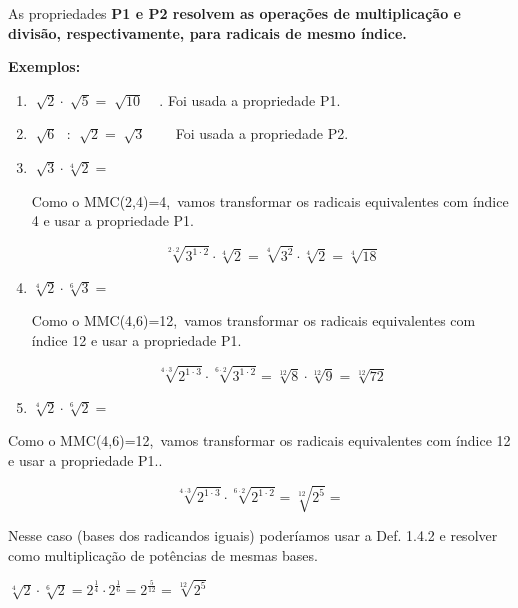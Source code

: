 As propriedades \textbf{P1 e P2 resolvem as operações de multiplicação e divisão, respectivamente, para radicais de mesmo índice. }

\textbf{Exemplos:}

\begin{enumerate}
	\item  \( \sqrt[]{2} \cdot \sqrt[]{5}=\sqrt[]{10} \) ~ . Foi usada a propriedade P1.

	\item  \( \sqrt[]{6}\text{~ : }\sqrt[]{2}=\sqrt[]{3} \) ~~~ Foi usada a propriedade P2.

	\item  \( \sqrt[]{3} \cdot \sqrt[4]{2}= \) 

Como o MMC(2,4)=4,~vamos transformar os radicais equivalentes com índice  4 e usar a propriedade P1.

 \[ \sqrt[2 \cdot 2]{3^{1 \cdot 2}} \cdot \sqrt[4]{2}=\sqrt[4]{3^{2}} \cdot \sqrt[4]{2}=\sqrt[4]{18} \] 

	\item  \( \sqrt[4]{2} \cdot \sqrt[6]{3}= \) 

Como o MMC(4,6)=12,~vamos transformar os radicais equivalentes com índice  12 e usar a propriedade P1.

 \[ \sqrt[4 \cdot 3]{2^{1 \cdot 3}} \cdot \sqrt[6 \cdot 2]{3^{1 \cdot 2}}=\sqrt[12]{8} \cdot \sqrt[12]{9}=\sqrt[12]{72} \] 

	\item  \( \sqrt[4]{2} \cdot \sqrt[6]{2}= \) 
\end{enumerate}

Como o MMC(4,6)=12,~vamos transformar os radicais equivalentes com índice  12 e usar a propriedade P1..

 \[ \sqrt[4 \cdot 3]{2^{1 \cdot 3}} \cdot \sqrt[6 \cdot 2]{2^{1 \cdot 2}}=\sqrt[12]{2^{5}}= \] 

Nesse caso (bases dos radicandos iguais) poderíamos usar a Def. 1.4.2 e resolver como multiplicação de potências de mesmas bases.

 \( \sqrt[4]{2} \cdot \sqrt[6]{2}=2^{\frac{1}{4}} \cdot 2^{\frac{1}{6}}=2^{\frac{5}{12}}=\sqrt[12]{2^{5}}~~~~~ \) \qedsymbol{}

